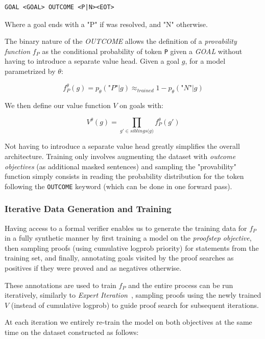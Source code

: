 \begin{verbatim}
GOAL <GOAL> OUTCOME <P|N><EOT>
\end{verbatim}

Where a goal ends with a "P" if was resolved, and "N" otherwise.

The binary nature of the \textit{OUTCOME} allows the definition of a \textit{provability function} $f_P$ as the conditional probability of token \verb|P| given a \textit{GOAL} without having to introduce a separate value head. Given a goal $g$, for a model parametrized by $\theta$:

$$
f_{P}^{\theta}(g) = p_{\theta}(\textit{"P"}|g) \approx_{\textit{trained}}
1-p_{\theta}(\textit{"N"}|g)
$$

We then define our value function $V$ on goals with:

$$
V^{\theta}(g) = \prod_{g' \in \textit{siblings(g)}} f_{P}^{\theta}(g')
$$

Not having to introduce a separate value head greatly simplifies the overall architecture. Training only involves augmenting the dataset with \textit{outcome objectives} (as additional masked sentences) and sampling the "provability" function simply consists in reading the probability distribution for the token following the \verb|OUTCOME| keyword (which can be done in one forward pass).

\subsubsection{Iterative Data Generation and Training}

Having access to a formal verifier enables us to generate the training data for $f_P$ in a fully synthetic manner by first training a model on the \textit{proofstep objective}, then sampling proofs (using cumulative logprob priority) for statements from the training set, and finally, annotating goals visited by the proof searches as positives if they were proved and as negatives otherwise.

These annotations are used to train $f_P$ and the entire process can be run iteratively, similarly to \textit{Expert Iteration}~\cite{anthony2017thinking}, sampling proofs using the newly trained $V$ (instead of cumulative logprob) to guide proof search for subsequent iterations.

At each iteration we entirely re-train the model on both objectives at the same time on the dataset constructed as follows:

